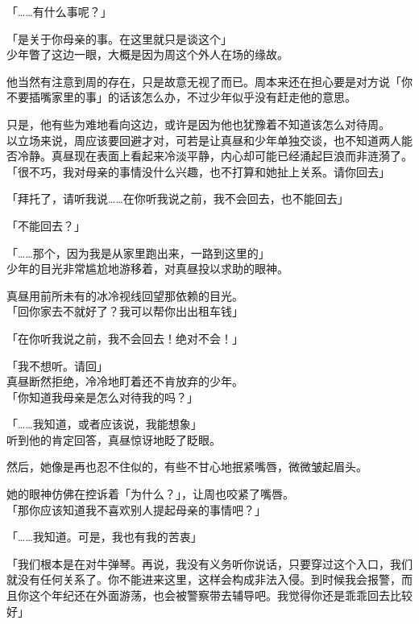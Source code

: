 「……有什么事呢？」

「是关于你母亲的事。在这里就只是谈这个」\\

少年瞥了这边一眼，大概是因为周这个外人在场的缘故。

他当然有注意到周的存在，只是故意无视了而已。周本来还在担心要是对方说「你不要插嘴家里的事」的话该怎么办，不过少年似乎没有赶走他的意思。

只是，他有些为难地看向这边，或许是因为他也犹豫着不知道该怎么对待周。\\

以立场来说，周应该要回避才对，可若是让真昼和少年单独交谈，也不知道两人能否冷静。真昼现在表面上看起来冷淡平静，内心却可能已经涌起巨浪而非涟漪了。\\

「很不巧，我对母亲的事情没什么兴趣，也不打算和她扯上关系。请你回去」

「拜托了，请听我说……在你听我说之前，我不会回去，也不能回去」

「不能回去？」

「……那个，因为我是从家里跑出来，一路到这里的」\\

少年的目光非常尴尬地游移着，对真昼投以求助的眼神。

真昼用前所未有的冰冷视线回望那依赖的目光。\\

「回你家去不就好了？我可以帮你出出租车钱」

「在你听我说之前，我不会回去！绝对不会！」

「我不想听。请回」\\

真昼断然拒绝，冷冷地盯着还不肯放弃的少年。\\

「你知道我母亲是怎么对待我的吗？」

「……我知道，或者应该说，我能想象」\\

听到他的肯定回答，真昼惊讶地眨了眨眼。

然后，她像是再也忍不住似的，有些不甘心地抿紧嘴唇，微微皱起眉头。

她的眼神仿佛在控诉着「为什么？」，让周也咬紧了嘴唇。\\

「那你应该知道我不喜欢别人提起母亲的事情吧？」

「……我知道。可是，我也有我的苦衷」

「我们根本是在对牛弹琴。再说，我没有义务听你说话，只要穿过这个入口，我们就没有任何关系了。你不能进来这里，这样会构成非法入侵。到时候我会报警，而且你这个年纪还在外面游荡，也会被警察带去辅导吧。我觉得你还是乖乖回去比较好」

